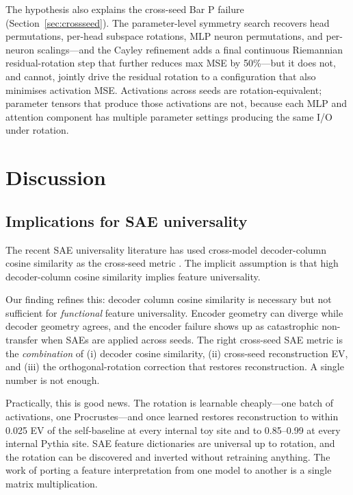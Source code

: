 \documentclass[11pt,letterpaper]{article}
\begin{document}
The hypothesis also explains the cross-seed Bar P failure (Section~\ref{sec:crossseed}). The parameter-level symmetry search recovers head permutations, per-head subspace rotations, MLP neuron permutations, and per-neuron scalings---and the Cayley refinement adds a final continuous Riemannian residual-rotation step that further reduces max MSE by 50\%---but it does not, and cannot, jointly drive the residual rotation to a configuration that also minimises activation MSE. Activations across seeds are rotation-equivalent; parameter tensors that produce those activations are not, because each MLP and attention component has multiple parameter settings producing the same I/O under rotation.

\section{Discussion}
\label{sec:discussion}

\subsection{Implications for SAE universality}

The recent SAE universality literature has used cross-model decoder-column cosine similarity as the cross-seed metric \citep{bricken2023monosemanticity,templeton2024scaling,lieberum2024gemma}. The implicit assumption is that high decoder-column cosine similarity implies feature universality.

Our finding refines this: decoder column cosine similarity is necessary but not sufficient for \emph{functional} feature universality. Encoder geometry can diverge while decoder geometry agrees, and the encoder failure shows up as catastrophic non-transfer when SAEs are applied across seeds. The right cross-seed SAE metric is the \emph{combination} of (i) decoder cosine similarity, (ii) cross-seed reconstruction EV, and (iii) the orthogonal-rotation correction that restores reconstruction. A single number is not enough.

Practically, this is good news. The rotation is learnable cheaply---one batch of activations, one Procrustes---and once learned restores reconstruction to within 0.025 EV of the self-baseline at every internal toy site and to 0.85--0.99 at every internal Pythia site. SAE feature dictionaries are universal up to rotation, and the rotation can be discovered and inverted without retraining anything. The work of porting a feature interpretation from one model to another is a single matrix multiplication.
\end{document}

